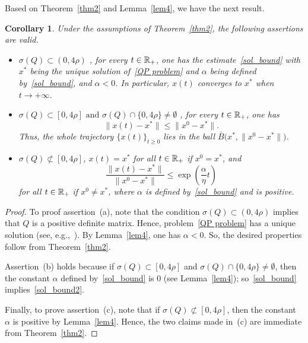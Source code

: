 \documentclass[11pt]{article}
\newtheorem{corollary}[theorem]{Corollary}
\theoremstyle{definition}
\theoremstyle{remark}
\def\R{\Bbb R}
\begin{document}
 Based on Theorem~\ref{thm2} and Lemma~\ref{lem4}, we have the next result.

\begin{corollary}\label{cor2_new}
	Under the assumptions of Theorem~\ref{thm2}, the following assertions are valid.
	 \begin{itemize}
		\item[{\rm (a)}]  $\sigma(Q)\subset(0,4\rho)$ , for every $t\in \R_+$, one has the estimate~\eqref{sol_bound} with $x^*$ being the unique solution of~\eqref{QP problem} and $\alpha$ being defined by~\eqref{sol_bound}, and $\alpha<0$. In particular, $x(t)$ converges to $x^*$ when $t\to +\infty$.
		\item[{\rm (b)}]  $\sigma(Q)\subset[0,4\rho] \text{ and } \sigma(Q)\cap\{0,4\rho\}\neq\emptyset$ , for every $t\in \R_+$, one has
		\begin{equation}\label{sol_bound2}
			\|x(t)-x^*\|\leq\|x^0-x^*\|.
		\end{equation}
			Thus, the whole trajectory $\{x(t)\}_{t\geq 0}$ lies in the ball $\bar B\big(x^*,\|x^0-x^*\|\big)$.
		\item[{\rm (c)}]  $\sigma(Q)\not\subset[0,4\rho]$,  $x(t)=x^*$ for all $t\in \R_+$ if $x^0=x^*$, and 
		\begin{equation}\label{sol_bound3}
			\dfrac{\|x(t)-x^*\|}{\|x^0-x^*\|}\leq \exp\left(\dfrac{\alpha}{\eta} t\right)
		\end{equation} for all $t\in \R_+$ if $x^0\neq x^*$, where  $\alpha$ is defined by~\eqref{sol_bound} and is positive.
	\end{itemize} 
\end{corollary}
\begin{proof} To proof assertion~(a), note that the condition $\sigma(Q)\subset(0,4\rho)$ implies that $Q$ is a positive definite matrix. Hence, problem~\eqref{QP problem} has a unique solution (see, e.g.,~\cite[Theorem~4.4]{lty05}). By Lemma~\ref{lem4}, one has $\alpha<0$. So, the desired properties follow from Theorem~\ref{thm2}.
	
	Assertion~(b) holds because if $\sigma(Q)\subset[0,4\rho]$ and $\sigma(Q)\cap\{0,4\rho\}\neq\emptyset$, then the constant $\alpha$ defined by~\eqref{sol_bound} is 0 (see Lemma~\ref{lem4}); so~\eqref{sol_bound} implies~\eqref{sol_bound2}.
	
	Finally, to prove assertion~(c), note that if $\sigma(Q)\not\subset[0,4\rho]$, then the constant $\alpha$ is positive by Lemma~\ref{lem4}. Hence, the two claims made in~(c) are immediate from Theorem~\ref{thm2}.	
\end{proof}
\end{document}
